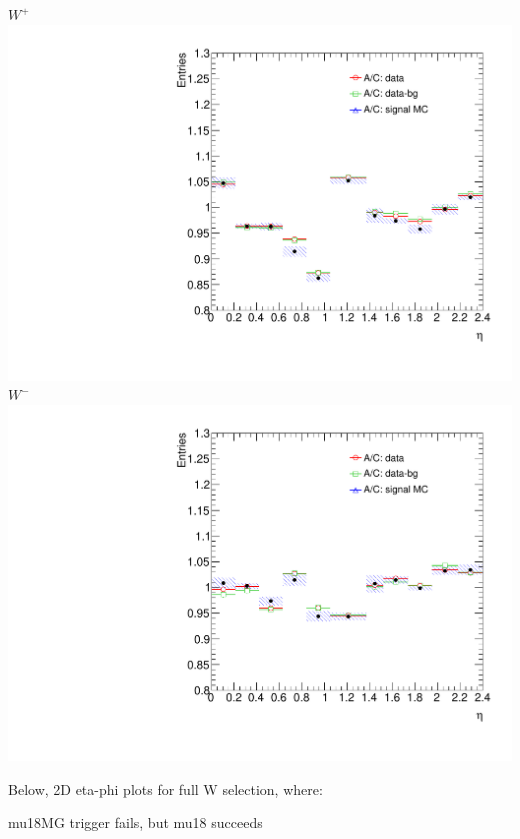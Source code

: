 {
\colb[T]
\centering
\small{ $W^{+}$}
\includegraphics[width=1.0\textwidth]{dates/20130403/figures/new/ACSIDE/W_NOM_Q0_stack_d3_eta_lpt_met_y_2__1_z_0__1_POS}
\centering
\small{ $W^{-}$}
\includegraphics[width=1.0\textwidth]{dates/20130403/figures/new/ACSIDE/W_NOM_Q0_stack_d3_eta_lpt_met_y_2__1_z_0__1_NEG}
\cole
}

 {
 Below, 2D eta-phi plots for full W selection, where:
 \iteb
 \item mu18MG trigger fails, but mu18 succeeds
 \itee
}

